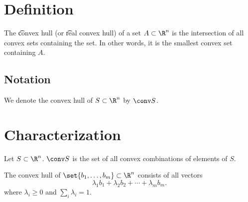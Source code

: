 
\section*{Definition}

The \t{convex hull} (or \t{real convex hull}) of a set $A \subset \R ^n$ is the intersection of all convex sets containing the set.
In other words, it is the smallest convex set containing $A$.

\subsection*{Notation}

We denote the convex hull of $S \subset \R ^n$ by $\conv S$.

\section*{Characterization}

\begin{proposition}
Let $S \subset \R ^n$. $\conv S$ is the set of all convex combinations of elements of $S$.
\end{proposition}

\begin{proposition}
The convex hull of $\set{b_1, \dots , b_m} \subset \R ^n$ consists of all vectors
\[
\lambda _1b_1 + \lambda _2b_2 + \cdots + \lambda _mb_m.
\]
where $\lambda _i \geq 0$ and $\sum_{i}\lambda _i = 1$.
\end{proposition}

\blankpage